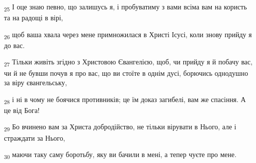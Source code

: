 \begin{tcolorbox}
\textsubscript{25} І оце знаю певно, що залишусь я, і пробуватиму з вами всіма вам на користь та на радощі в вірі,
\end{tcolorbox}
\begin{tcolorbox}
\textsubscript{26} щоб ваша хвала через мене примножилася в Христі Ісусі, коли знову прийду я до вас.
\end{tcolorbox}
\begin{tcolorbox}
\textsubscript{27} Тільки живіть згідно з Христовою Євангелією, щоб, чи прийду я й побачу вас, чи й не бувши почув я про вас, що ви стоїте в однім дусі, борючись однодушно за віру євангельську,
\end{tcolorbox}
\begin{tcolorbox}
\textsubscript{28} і ні в чому не боячися противників; це їм доказ загибелі, вам же спасіння. А це від Бога!
\end{tcolorbox}
\begin{tcolorbox}
\textsubscript{29} Бо вчинено вам за Христа добродійство, не тільки вірувати в Нього, але і страждати за Нього,
\end{tcolorbox}
\begin{tcolorbox}
\textsubscript{30} маючи таку саму боротьбу, яку ви бачили в мені, а тепер чуєте про мене.
\end{tcolorbox}
